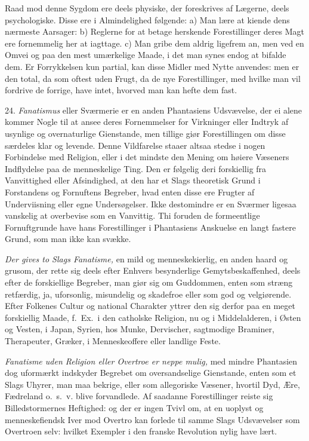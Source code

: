 \documentclass[12pt,a4paper]{article}
\newcommand{\opage}[1]{\marginnote{\footnotesize\textit{[#1]}}}
\begin{document}
Raad mod denne Sygdom ere deels physiske, der foreskrives af Lægerne, deels
psychologiske. Disse ere i Almindelighed følgende: a) Man lære at kiende dens nærmeste
Aarsager: b) Reglerne for at betage herskende Forestillinger deres Magt ere fornemmelig
her at iagttage. c) Man gribe dem aldrig ligefrem an, men ved en Omvei og paa den mest
umærkelige Maade, i det
\opage{141} man synes endog at bifalde dem. Er Forrykkelsen kun partial, kan disse Midler med Nytte
anvendes: men er den total, da som oftest uden Frugt, da de nye Forestillinger, med
hvilke man vil fordrive de forrige, have intet, hvorved man kan hefte dem fast.

24. \emph{Fanatismus} eller Sværmerie er en anden Phantasiens Udsvævelse, der ei alene
kommer Nogle til at ansee deres Fornemmelser for Virkninger eller Indtryk af usynlige og
overnaturlige Gienstande, men tillige giør Forestillingen om disse særdeles klar og
levende. Denne Vildfarelse staaer altsaa stedse i nogen Forbindelse med Religion, eller i
det mindste den Mening om høiere Væseners Indflydelse paa de menneskelige Ting. Den er
følgelig deri forskiellig fra Vanvittighed eller Afsindighed, at den har et Slags
theoretisk Grund i Forstandens og Fornuftens Begreber, hvad enten disse ere Frugter af
Underviisning eller egne Undersøgelser. Ikke destomindre er en Sværmer ligesaa vanskelig
at overbevise som en Vanvittig. Thi foruden de formeentlige Fornuftgrunde have hans
Forestillinger i Phantasiens Anskuelse en langt fastere Grund, som man ikke kan svække.

\emph{Der gives to Slags Fanatisme,} en mild og menneskekierlig, en anden haard og
grusom, der rette sig deels efter Enhvers besynderlige Gemytsbeskaffenhed, deels efter de
forskiellige Begreber, man giør sig om Guddommen, enten som stræng retfærdig, ja,
\opage{142} uforsonlig, misundelig og skadefroe eller som god og velgiørende. Efter Folkenes Cultur
og national Charakter yttrer den sig derfor paa en meget forskiellig Maade, f.~Ex.\ i den
catholske Religion, nu og i Middelalderen, i Østen og Vesten, i Japan, Syrien, hos Munke,
Dervischer, sagtmodige Braminer, Therapeuter, Græker, i Menneskeoffere eller landlige
Feste.

\emph{Fanatisme uden Religion eller Overtroe er neppe mulig,} med mindre Phantasien dog
uformærkt indskyder Begrebet om oversandselige Gienstande, enten som et Slags Uhyrer, man
maa bekrige, eller som allegoriske Væsener, hvortil Dyd, Ære, Fædreland o.~s.~v. blive
forvandlede. Af saadanne Forestillinger reiste sig Billedstormernes Heftighed: og der er
ingen Tvivl om, at en uoplyst og menneskefiendsk Iver mod Overtro kan forlede til samme
Slags Udsvævelser som Overtroen selv: hvilket Exempler i den franske Revolution nylig
have lært.
\end{document}
